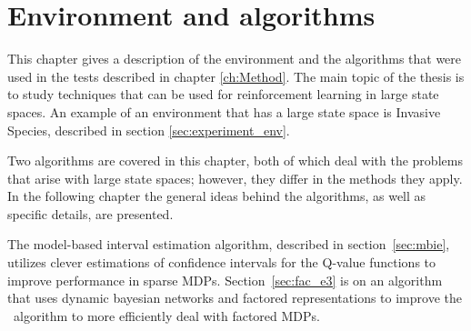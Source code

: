 \chapter{Environment and algorithms}
\label{ch:algo}

This chapter gives a description of the environment and  the algorithms that were used in the
tests described in chapter \ref{ch:Method}. The main topic of the thesis is to study techniques that can be used for
reinforcement learning in large state spaces. An example of an environment that has
a large state space is Invasive Species, described in section \ref{sec:experiment_env}. 

Two algorithms are covered in this chapter, both of which deal with the problems that 
arise with large state spaces; however, they differ in the methods they apply. In 
the following chapter the general ideas behind the algorithms, as well as specific details, are
presented. 

The model-based interval estimation algorithm, described in
section~\ref{sec:mbie}, utilizes clever estimations of confidence intervals for
the Q-value functions to improve performance in sparse MDPs.
Section~\ref{sec:fac_e3} is on an algorithm that uses dynamic bayesian networks
and factored representations to improve the \etre\ algorithm to more efficiently deal with factored MDPs. 




